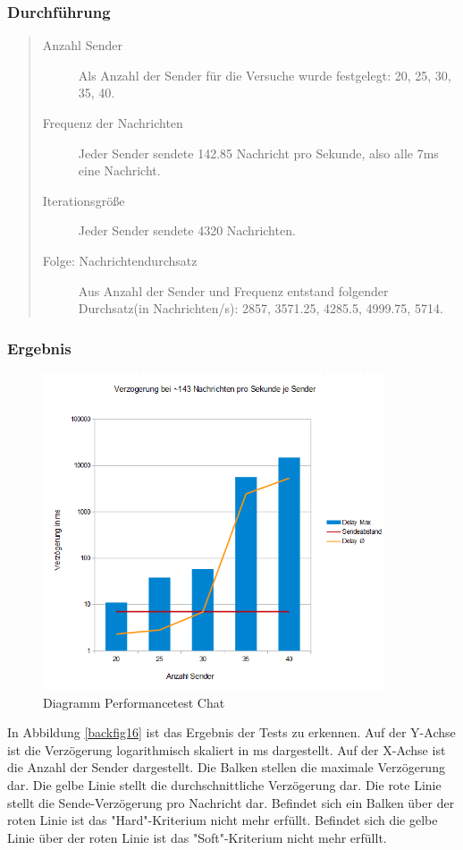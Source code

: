 \subsubsection{Durchführung}
\begin{quote}
  \begin{description}
  \item[Anzahl Sender]
  Als Anzahl der Sender für die Versuche wurde festgelegt: 20, 25, 30, 35, 40.

  \item[Frequenz der Nachrichten]
  Jeder Sender sendete 142.85 Nachricht pro Sekunde, also alle 7ms eine Nachricht.

  \item[Iterationsgröße]
  Jeder Sender sendete 4320 Nachrichten.

  \item[Folge: Nachrichtendurchsatz]
  Aus Anzahl der Sender und Frequenz entstand folgender Durchsatz(in Nachrichten/s): 2857, 3571.25, 4285.5, 4999.75, 5714.
  \end{description}
\end{quote}



\subsubsection{Ergebnis}
\begin{figure}[htH]
\centering
\includegraphics[width=0.9\textwidth]{backend/Diagramm_Performance_144hz.PNG}
\caption{Diagramm Performancetest Chat}
\label{backfig18}
\end{figure}
In Abbildung \ref{backfig16} ist das Ergebnis der Tests zu erkennen. 
Auf der Y-Achse ist die Verzögerung logarithmisch skaliert in ms dargestellt.
Auf der X-Achse ist die Anzahl der Sender dargestellt.
Die Balken stellen die maximale Verzögerung dar. 
Die gelbe Linie stellt die durchschnittliche Verzögerung dar.
Die rote Linie stellt die Sende-Verzögerung pro Nachricht dar.
Befindet sich ein Balken über der roten Linie ist das "Hard"-Kriterium nicht mehr erfüllt.
Befindet sich die gelbe Linie über der roten Linie ist das "Soft"-Kriterium nicht mehr erfüllt.



